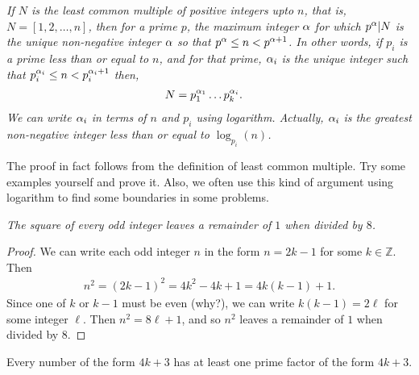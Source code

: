 \documentclass{subfile}
\begin{document}
	\begin{theorem}\slshape\label{thm:lcmfactor}
		If $N$ is the least common multiple of positive integers upto $n$, that is, $N=[1,2,\dots,n]$, then for a prime $p$, the maximum  integer $\alpha $ for which $p^\alpha |N$ is the unique non-negative integer $\alpha $ so that $p^\alpha \leq n<p^{\alpha +1}$. In other words, if $p_i$ is a prime less than or equal to $n$, and for that prime, $\alpha_i$ is the unique integer such that $p_i^{\alpha _i}\leq n<p_i^{\alpha _i+1}$ then,
		\begin{align*}
			N & = p_1^{\alpha _1}\dots p_k^{\alpha_i}.
		\end{align*}\label{thm:lcm}
		We can write $\alpha _i$ in terms of $n$ and $p_i$ using logarithm. Actually, $\alpha_i$ is the greatest non-negative integer less than or equal to $\log_{p_i}(n)$.
	\end{theorem}
	The proof in fact follows from the definition of least common multiple. Try some examples yourself and prove it. Also, we often use this kind of argument using logarithm to find some boundaries in some problems.

	\begin{theorem}\slshape
		The square of every odd integer leaves a remainder of $1$ when divided by $8$.
	\end{theorem}

	\begin{proof}
		We can write each odd integer $n$ in the form $n=2k-1$ for some $k\in\mathbb{Z}$. Then
		\begin{align*}
			n^2 = (2k-1)^2  = 4k^2-4k+1 = 4k(k-1)+1.
		\end{align*}
		Since one of $k$ or $k-1$ must be even (why?), we can write $k(k-1)=2\ell$ for some integer $\ell$. Then $n^2=8\ell+1$, and so $n^2$ leaves a remainder of $1$ when divided by $8$.
	\end{proof}

	\begin{theorem}\label{thm:4k+3prime}
		Every number of the form $4k+3$ has at least one prime factor of the form $4k+3$.
	\end{theorem}
\end{document}
